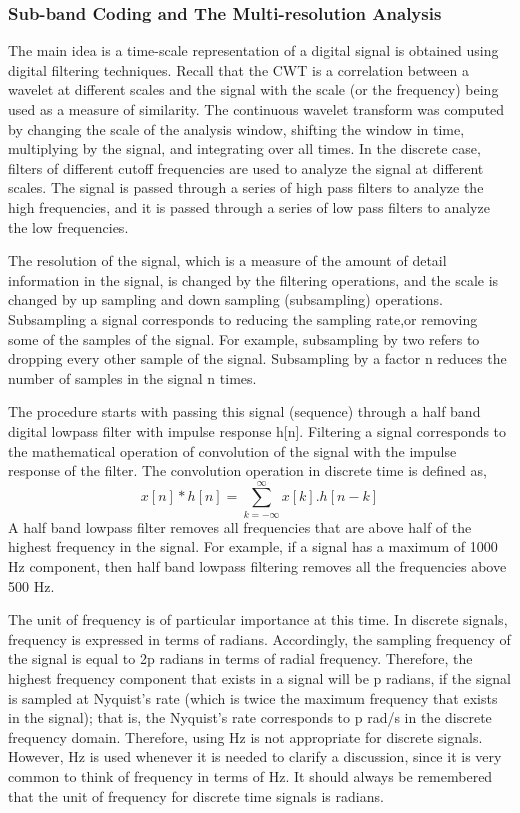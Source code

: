 \documentclass[12pt, a4paper, twoside]{report}
\begin{document}
\subsubsection{Sub-band Coding and The Multi-resolution Analysis}
The main idea is a time-scale representation of a digital signal is obtained using digital filtering techniques. Recall that the CWT is a correlation between a wavelet at different scales and the signal with the scale (or the frequency) being used as a measure of similarity. The continuous wavelet transform was computed by changing the scale of the analysis window, shifting the window in time, multiplying by the signal, and integrating over all times. In the discrete case, filters of different cutoff frequencies are used to analyze the signal at different scales. The signal is passed through a series of high pass filters to analyze the high frequencies, and it is passed through a series of low pass filters to analyze the low frequencies. 
\par
The resolution of the signal, which is a measure of the amount of detail information in the signal, is changed by the filtering operations, and the scale is changed by up sampling and down sampling (subsampling) operations. Subsampling a signal corresponds to reducing the sampling rate,or removing some of the samples of the signal. For example, subsampling by two refers to dropping every other sample of the signal. Subsampling by a factor n reduces the number of samples in the signal n times.
\par
The procedure starts with passing this signal (sequence) through a half band digital lowpass filter with impulse response h[n]. Filtering a signal corresponds to the mathematical operation of convolution of the signal with the impulse response of the filter. The convolution operation in discrete time is defined as,
\begin{equation}
x[n]*h[n] = \sum_{k=-\infty}^{\infty} x[k].h[n-k]
\end{equation}
A half band lowpass filter removes all frequencies that are above half of the highest frequency in the signal. For example, if a signal has a maximum of 1000 Hz component, then half band lowpass filtering removes all the frequencies above 500 Hz.
\par
The unit of frequency is of particular importance at this time. In discrete signals, frequency is expressed in terms of radians. Accordingly, the sampling frequency of the signal is equal to 2p radians in terms of radial frequency. Therefore, the highest frequency component that exists in a signal will be p radians, if the signal is sampled at Nyquist’s rate (which is twice the maximum frequency that exists in the signal); that is, the Nyquist’s rate corresponds to p rad/s in the discrete frequency domain. Therefore, using Hz is not appropriate for discrete signals. However, Hz is used whenever it is needed to clarify a discussion, since it is very common to think of frequency in terms of Hz. It should always be remembered that the unit of frequency for discrete time signals is radians.
\end{document}
